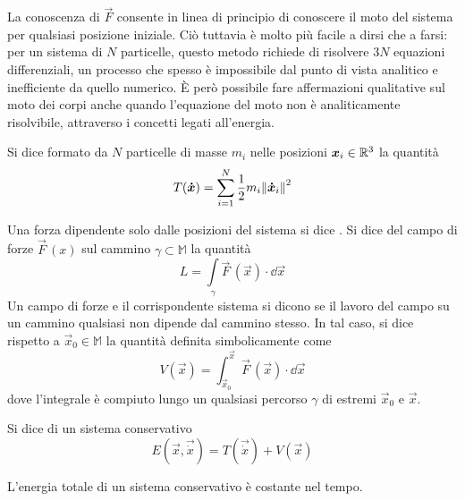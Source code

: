 La conoscenza di $\vec{F}$ consente in linea di principio di conoscere il moto del sistema per qualsiasi posizione iniziale. Ciò tuttavia è molto più facile a dirsi che a farsi: per un sistema di $N$ particelle, questo metodo richiede di risolvere $3N$ equazioni differenziali, un processo che spesso è impossibile dal punto di vista analitico e inefficiente da quello numerico. È però possibile fare affermazioni qualitative sul moto dei corpi anche quando l'equazione del moto non è analiticamente risolvibile, attraverso i concetti legati all'energia.
\begin{definition}
  Si dice  formato da $N$ particelle di masse $m_i$ nelle posizioni $\boldsymbol{x}_i \in \mathbb{R}^3$ la quantità \begin{equation}
    T(\boldsymbol{\dot{x}}) = \sum_{i=1}^{N} \frac{1}{2}m_i\norm{\boldsymbol{\dot{x}}_i}^2
  \end{equation} 
\end{definition}
\begin{definition}
  Una forza dipendente solo dalle posizioni del sistema si dice . Si dice  del campo di forze $\vec{F}\, (x)$ sul cammino $\gamma \subset \mathbb{M}$ la quantità \begin{equation}
  L = \int\limits_{\gamma} \vec{F}\,(\vec{x})\cdot \dd \vec{x}
  \end{equation} 
  Un campo di forze e il corrispondente sistema si dicono  se il lavoro del campo su un cammino qualsiasi non dipende dal cammino stesso. In tal caso, si dice  rispetto a $\vec{x}_0 \in \mathbb{M}$ la quantità definita simbolicamente come \begin{equation}
  V(\vec{x}) = \int_{\vec{x}_0}^{\vec{x}} \vec{F}\,(\vec{x})\cdot \dd \vec{x}
  \end{equation} 
  dove l'integrale è compiuto lungo un qualsiasi percorso $\gamma$ di estremi $\vec{x}_0$ e $\vec{x}$.
\end{definition}
\begin{definition}
  Si dice  di un sistema conservativo\begin{equation}
  E(\vec{x},\vec{\dot{x}}) = T(\vec{\dot{x}}) + V(\vec{x})
  \end{equation} 
\end{definition}
\begin{theorem} \label{thm:energyCons}
L'energia totale di un sistema conservativo è costante nel tempo.
\end{theorem}

